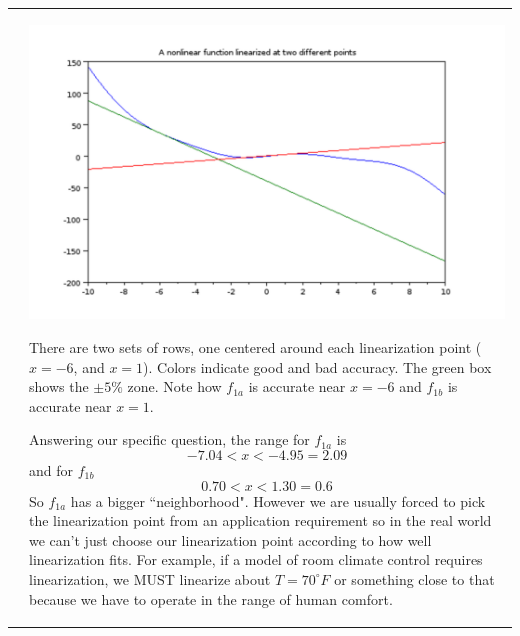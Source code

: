 \begin{Example}
\begin{tabular}{cp{}}
&

\begin{minipage}{0.45\textwidth}
\begin{center}
{\includegraphics[width=\textwidth]{figs01/linearizeattwopointsa.png}}
\end{center}

There are two sets of rows, one centered around each linearization point ($x=-6$, and $x=1$).
Colors indicate good and bad accuracy.  The green box shows the $\pm5\%$ zone.  Note how
$f_{1a}$ is accurate near $x=-6$ and $f_{1b}$ is accurate near $x=1$.

Answering our specific question, the range for $f_{1a}$ is
\[
-7.04 < x < -4.95 =  2.09
\]
and for $f_{1b}$
\[
0.70 < x < 1.30 = 0.6
\]
So $f_{1a}$ has a bigger ``neighborhood".    However we are usually forced to pick the linearization point from
an application requirement so in the real world we can't just choose our linearization point according to how well linearization fits. For example, if a model of room climate control requires linearization, we MUST linearize about $T=70^\circ F$ or something close to that because we have to operate in the range of human comfort.
\end{minipage}

\vspace{0.35in}



\end{tabular}

\end{Example}






























